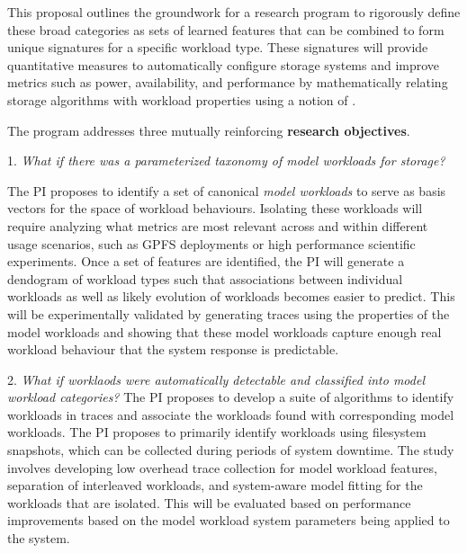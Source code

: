 This proposal outlines the groundwork for a research program to rigorously
define these broad categories as sets of learned features that
can be combined to form unique signatures for a specific workload type.
These signatures will provide quantitative
measures to automatically configure storage systems and improve metrics such as power, availability, and
performance by mathematically relating storage algorithms with workload
properties using a notion of \systemfit.

The program addresses three mutually reinforcing \textbf{research objectives}.
\begin{myitemize}

\item[1.]
\emph{What if there was a parameterized taxonomy of \textit{model workloads} for
storage?}

The PI proposes to identify a set of canonical \textit{model workloads} to serve as basis vectors for the space
of workload behaviours.  Isolating these workloads will require analyzing what
metrics are most relevant across and within different usage scenarios, such as
GPFS deployments or high performance scientific experiments.  Once a set of
features are identified, the PI will generate a dendogram of workload types such
that associations between individual workloads as well as likely evolution of
workloads becomes easier to predict.  This will be experimentally validated by
generating traces using the properties of the model workloads and showing that
these model workloads capture enough real workload behaviour that the system
response is predictable.  

\item[2.]
\emph{What if worklaods were automatically detectable and classified into
\textit{model workload} categories?}
The PI proposes to develop a suite of algorithms to identify workloads in traces and associate the workloads found with corresponding model
workloads.  The PI proposes to primarily identify workloads using
filesystem snapshots, which can be collected during periods of system downtime.
The study involves developing low overhead trace collection for model workload
features, separation of interleaved workloads, and system-aware model fitting
for the workloads that are isolated.  This will be evaluated based on
performance improvements based on the model workload system parameters being
applied to the system.



\end{myitemize}
